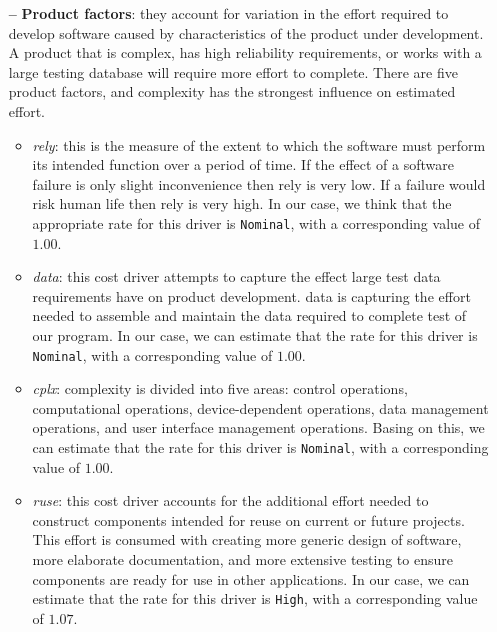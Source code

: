 \begin{itemize}

\item[\textbf{--}] \textbf{Product factors}: they account for variation in the effort required to develop software caused by characteristics of the product under development. A product that is complex, has high reliability requirements, or works with a large testing database will require more effort to complete. There are five product factors, and complexity has the strongest influence on estimated effort.

\begin{itemize}
	
	\item \textit{\acl{rely}}: this is the measure of the extent to which the software must perform its intended function over a period of time. If the effect of a software failure is only slight inconvenience then \acs{rely} is very low. If a failure would risk human life then \acs{rely} is very high. In our case, we think that the appropriate rate for this driver is \texttt{Nominal}, with a corresponding value of $1.00$.
	
	\item \textit{\acl{data}}: this cost driver attempts to capture the effect large test data requirements have on product development. \acs{data} is capturing the effort needed to assemble and maintain the data required to complete test of our program. In our case, we can estimate that the rate for this driver is \texttt{Nominal}, with a corresponding value of $1.00$.
	
	\item \textit{\acl{cplx}}: complexity is divided into five areas: control operations, computational operations, device-dependent operations, data management operations, and user interface management operations.  Basing on this, we can estimate that the rate for this driver is \texttt{Nominal}, with a corresponding value of $1.00$.
	
	\item \textit{\acl{ruse}}: this cost driver accounts for the additional effort needed to construct components intended for reuse on current or future projects. This effort is consumed with creating more generic design of software, more elaborate documentation, and more extensive testing to ensure components are ready for use in other applications. In our case, we can estimate that the rate for this driver is \texttt{High}, with a corresponding value of $1.07$.
	

\end{itemize}
\end{itemize}
